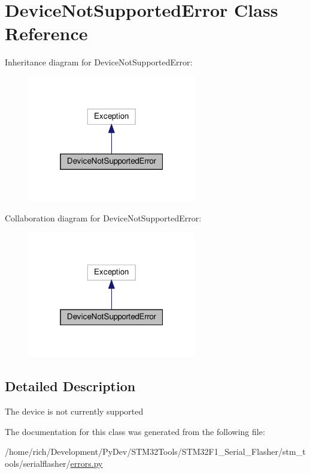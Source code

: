 \hypertarget{classstm__tools_1_1serialflasher_1_1errors_1_1DeviceNotSupportedError}{}\section{Device\+Not\+Supported\+Error Class Reference}
\label{classstm__tools_1_1serialflasher_1_1errors_1_1DeviceNotSupportedError}


Inheritance diagram for Device\+Not\+Supported\+Error\+:
\nopagebreak
\begin{figure}[H]
\begin{center}
\leavevmode
\includegraphics[width=208pt]{classstm__tools_1_1serialflasher_1_1errors_1_1DeviceNotSupportedError__inherit__graph}
\end{center}
\end{figure}


Collaboration diagram for Device\+Not\+Supported\+Error\+:
\nopagebreak
\begin{figure}[H]
\begin{center}
\leavevmode
\includegraphics[width=208pt]{classstm__tools_1_1serialflasher_1_1errors_1_1DeviceNotSupportedError__coll__graph}
\end{center}
\end{figure}


\subsection{Detailed Description}
\begin{DoxyVerb}The device is not currently supported\end{DoxyVerb}
 

The documentation for this class was generated from the following file\+:\begin{DoxyCompactItemize}
\item 
/home/rich/\+Development/\+Py\+Dev/\+S\+T\+M32\+Tools/\+S\+T\+M32\+F1\+\_\+\+Serial\+\_\+\+Flasher/stm\+\_\+tools/serialflasher/\hyperlink{errors_8py}{errors.\+py}\end{DoxyCompactItemize}
